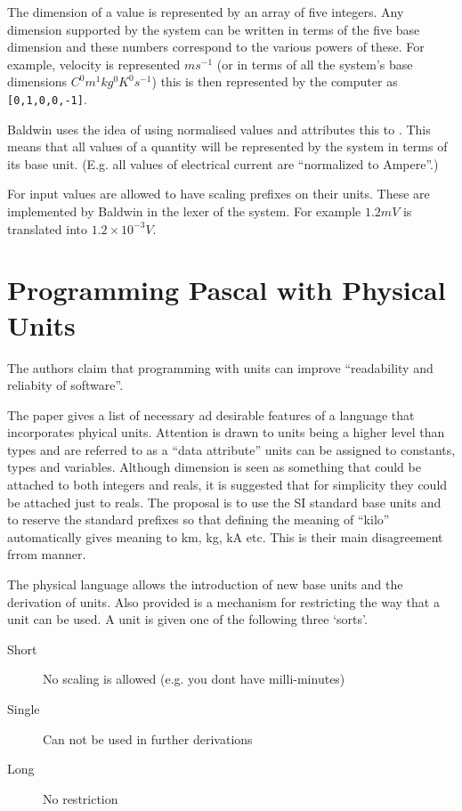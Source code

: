 \documentclass[a4paper]{article}
\begin{document}
The dimension of a value is represented by an array of five integers. 
Any dimension supported by the system can be written in terms of the five
base dimension and these numbers correspond to the various powers 
of these. For example, velocity is represented $ms^{-1}$ (or in terms of all the
system's base dimensions $C^0m^1kg^0K^0s^{-1}$) this is then represented by 
the computer as \texttt{[0,1,0,0,-1]}.

Baldwin uses the idea of using normalised values and attributes this to 
\cite{ME_physical}. This means that all values of a quantity will be 
represented by the system in terms of its base unit. (E.g. all values of 
electrical current are ``normalized to Ampere''.)

For input values are allowed to have scaling prefixes on their units. 
These are implemented by Baldwin in the lexer of the system. For example $1.2mV$
is translated into $1.2\times10^{-3} V$.

\section{Programming Pascal with Physical Units \cite{ME_physical}}
The authors claim that programming with units can improve ``readability and 
reliabity of software''.

The paper gives a list of necessary ad desirable features of a language that 
incorporates phyical units. 
Attention is drawn to units being a higher level than types and are referred to 
as a ``data attribute'' units can be assigned to constants, types and variables. 
Although dimension is seen as something that could be attached to both integers 
and reals, it is suggested that for simplicity they could be attached just to 
reals.
The proposal is to use the SI standard base units and to reserve the  standard 
prefixes so that defining the meaning of ``kilo'' automatically gives meaning to
km, kg, kA etc. This is their main disagreement frrom manner.

The physical language allows the introduction of  new base units and the 
derivation of units. Also provided is a mechanism for restricting the way that 
a unit can be used. A unit is given one of the following three `sorts'.

\begin{description}
\item[Short] No scaling is allowed (e.g. you dont have milli-minutes)
\item[Single] Can not be used in further derivations
\item[Long] No restriction
\end{description}
\end{document}
